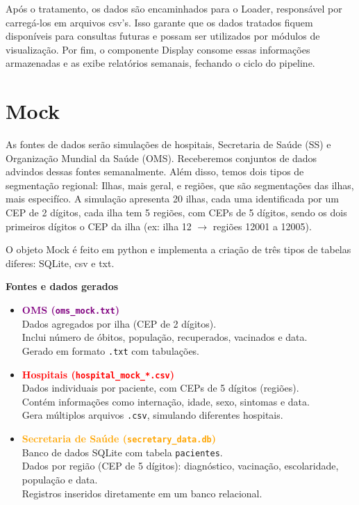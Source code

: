 \documentclass[a4paper,12pt]{article}
\begin{document}
Após o tratamento, os dados são encaminhados para o Loader, responsável por carregá-los em arquivos csv's. Isso garante que os dados tratados fiquem disponíveis para consultas futuras e possam ser utilizados por módulos de visualização. Por fim, o componente Display consome essas informações armazenadas e as exibe relatórios semanais, fechando o ciclo do pipeline. 

\section{Mock}

As fontes de dados serão simulações de hospitais,  Secretaria de Saúde (SS) e Organização Mundial da Saúde (OMS). Receberemos conjuntos de dados advindos dessas fontes semanalmente. Além disso, temos dois tipos de segmentação regional: Ilhas, mais geral, e regiões, que são segmentações das ilhas, mais especifíco. A simulação apresenta 20 ilhas, cada uma identificada por um CEP de 2 dígitos, cada ilha tem 5 regiões, com CEPs de 5 dígitos, sendo os dois primeiros dígitos o CEP da ilha (ex: ilha 12 $\rightarrow$ regiões 12001 a 12005).


O objeto Mock é feito em python e implementa a criação de três tipos de tabelas diferes: SQLite, csv e txt.
\vspace{0.5cm}

\textbf{Fontes e dados gerados}

\begin{itemize}
    \item \textcolor{purple}{\textbf{OMS (\texttt{oms\_mock.txt})}}\\
    Dados agregados por ilha (CEP de 2 dígitos).\\
    Inclui número de óbitos, população, recuperados, vacinados e data.\\
    Gerado em formato \texttt{.txt} com tabulações.
    
    \vspace{0.5em}
    
    \item \textcolor{red}{\textbf{Hospitais (\texttt{hospital\_mock\_*.csv})}}\\
    Dados individuais por paciente, com CEPs de 5 dígitos (regiões).\\
    Contém informações como internação, idade, sexo, sintomas e data.\\
    Gera múltiplos arquivos \texttt{.csv}, simulando diferentes hospitais.
    
    \vspace{0.5em}
    
    \item \textcolor{orange}{\textbf{Secretaria de Saúde (\texttt{secretary\_data.db})}}\\
    Banco de dados SQLite com tabela \texttt{pacientes}.\\
    Dados por região (CEP de 5 dígitos): diagnóstico, vacinação, escolaridade, população e data.\\
    Registros inseridos diretamente em um banco relacional.
\end{itemize}
\end{document}
